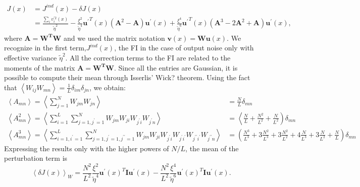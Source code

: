\documentclass[a4paper]{article}%
\begin{document}
\begin{equation}
\begin{split}
J(x)  & = J^{ind}(x) - \delta J(x)\\
& = \frac{\sum_{i} v^{\prime2}_{i}(x)}{\tilde\eta^{2}} -\frac{\xi^{2}}
{\tilde\eta^{4}} \mathbf{u^{\prime}}^{T}(x) \left(\mathbf{A}^{2} - \mathbf{A}
\right)\mathbf{u^{\prime}}(x) + \frac{\xi^{4}}{\tilde\eta^{6}}\mathbf{u^{\prime}
}^{T}(x) \left(\mathbf{A}^{3} - 2\mathbf{A}^{2} + \mathbf{A}\right)\mathbf{u^{\prime}
}(x),
\end{split}
\end{equation}
where $\mathbf{A=W^{T}W}$ and we used the matrix notation $\mathbf{v}(x) =
\mathbf{Wu}(x)$. We recognize in the first term,$J^{ind}(x)$, the FI in the case of output noise only with effective variance $\tilde{\eta}^2$. All the
correction terms to the FI are related to the moments of the matrix
$\mathbf{A} = \mathbf{W^{T}W}$. Since all the entries are Gaussian, it is
possible to compute their mean through Isserlis' \textcolor{Mirko}{Wick?}
theorem. Using the fact that $\left\langle W_{ij}W_{mn}\right\rangle = \frac{1}{L}\delta_{im}
\delta_{jn}$, we obtain:
\begin{equation}
\begin{split}
\left\langle A_{mn}\right\rangle = \left\langle \sum_{j=1}^N W_{jm}W_{jn}\right\rangle  & = \frac{N}{L}\delta_{mn}\\
\left\langle A^{2}_{mn}\right\rangle = \left\langle \sum_{i=1}^{L} \sum_{j=1,j^{\prime}=1}^{N} W_{jm}
W_{ji}W_{j^{\prime}i}W_{j^{\prime}n}\right \rangle  & = \left\langle \frac{N}{L} + \frac{N^{2}}{L^{2}}
+ \frac{N}{L^{2}}\right)\delta_{mn}\\
\left\langle A^{3}_{mn}\right\rangle = \left\langle \sum_{i=1,i^{\prime}=1}^{L} \sum_{j=1,j^{\prime
}=1,j^{\prime\prime}=1}^{N} W_{jm}W_{ji}W_{j^{\prime}i}W_{j^{\prime}i^{\prime
}}W_{j^{\prime\prime}i^{\prime}}W_{j^{\prime\prime}n}\right\rangle  & =\left(\frac{N^{3}
}{L^{3}} + 3\frac{N^{2}}{L^{3}} + 3\frac{N^{2}}{L^{2}} + 4\frac{N}{L^{3}} +
3\frac{N}{L^{2}} + \frac{N}{L} \right) \delta_{mn}
\end{split}
\end{equation}
Expressing the results only with the higher powers of $N/L$, the mean of the perturbation term is
\begin{equation}
\left \langle\delta J(x)\right\rangle_{W} = \frac{N^{2}
}{L^{2}} \frac{\xi^{2}}{\tilde\eta^{4}}\mathbf{u^{\prime}}(x)^{T} \mathbf{I} \mathbf{u^{\prime}}(x) -\frac{N^2}{L^2}
\frac{\xi^{4}}{\tilde\eta^{6}}  \mathbf{u^{\prime}}(x)^{T}
\mathbf{I} \mathbf{u^{\prime}}(x).
\end{equation}
\end{document}
